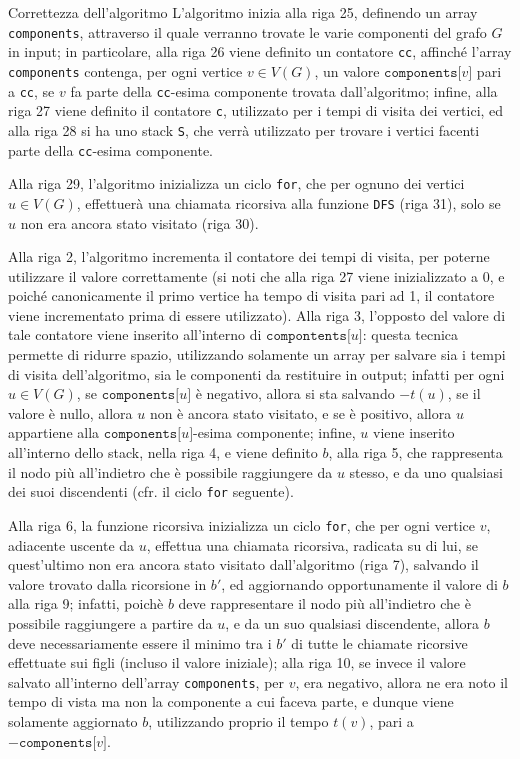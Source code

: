 \documentclass[a4paper, 12pt]{report}
\begin{document}
    \begin{framedobs}{Correttezza dell'algoritmo}
        L'algoritmo inizia alla riga 25, definendo un array \texttt{components}, attraverso il quale verranno trovate le varie componenti del grafo $G$ in input; in particolare, alla riga 26 viene definito un contatore \texttt{cc}, affinché l'array \texttt{components} contenga, per ogni vertice $v \in V(G)$, un valore $\texttt{components[}v\texttt{]}$ pari a \texttt{cc}, se $v$ fa parte della \texttt{cc}-esima componente trovata dall'algoritmo; infine, alla riga 27 viene definito il contatore \texttt{c}, utilizzato per i tempi di visita dei vertici, ed alla riga 28 si ha uno stack \texttt{S}, che verrà utilizzato per trovare i vertici facenti parte della \texttt{cc}-esima componente.
        
        Alla riga 29, l'algoritmo inizializza un ciclo \texttt{for}, che per ognuno dei vertici $u \in V(G)$, effettuerà una chiamata ricorsiva alla funzione \texttt{DFS} (riga 31), solo se $u$ non era ancora stato visitato (riga 30).

        Alla riga 2, l'algoritmo incrementa il contatore dei tempi di visita, per poterne utilizzare il valore correttamente (si noti che alla riga 27 viene inizializzato a 0, e poiché canonicamente il primo vertice ha tempo di visita pari ad 1, il contatore viene incrementato prima di essere utilizzato). Alla riga 3, l'opposto del valore di tale contatore viene inserito all'interno di $\texttt{compontents[}u\texttt{]}$: questa tecnica permette di ridurre spazio, utilizzando solamente un array per salvare sia i tempi di visita dell'algoritmo, sia le componenti da restituire in output; infatti per ogni $u \in V(G)$, se $\texttt{components[}u\texttt{]}$ è negativo, allora si sta salvando $-t(u)$, se il valore è nullo, allora $u$ non è ancora stato visitato, e se è positivo, allora $u$ appartiene alla $\texttt{components[}u\texttt{]}$-esima componente; infine, $u$ viene inserito all'interno dello stack, nella riga 4, e viene definito $b$, alla riga 5, che rappresenta il nodo più all'indietro che è possibile raggiungere da $u$ stesso, e da uno qualsiasi dei suoi discendenti (cfr. il ciclo \texttt{for} seguente).

        Alla riga 6, la funzione ricorsiva inizializza un ciclo \texttt{for}, che per ogni vertice $v$, adiacente uscente da $u$, effettua una chiamata ricorsiva, radicata su di lui, se quest'ultimo non era ancora stato visitato dall'algoritmo (riga 7), salvando il valore trovato dalla ricorsione in $b'$, ed aggiornando opportunamente il valore di $b$ alla riga 9; infatti, poichè $b$ deve rappresentare il nodo più all'indietro che è possibile raggiungere a partire da $u$, e da un suo qualsiasi discendente, allora $b$ deve necessariamente essere il minimo tra i $b'$ di tutte le chiamate ricorsive effettuate sui figli (incluso il valore iniziale); alla riga 10, se invece il valore salvato all'interno dell'array \texttt{components}, per $v$, era negativo, allora ne era noto il tempo di vista ma non la componente a cui faceva parte, e dunque viene solamente aggiornato $b$, utilizzando proprio il tempo $t(v)$, pari a $-\texttt{components[}v\texttt{]}$.


\end{framedobs}
\end{document}
